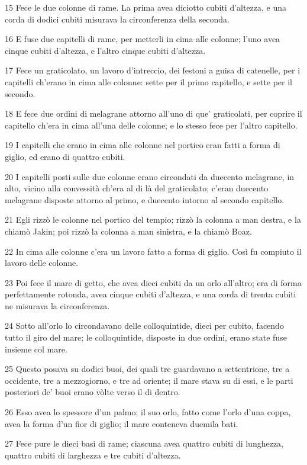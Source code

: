 \par 15 Fece le due colonne di rame. La prima avea diciotto cubiti d'altezza, e una corda di dodici cubiti misurava la circonferenza della seconda.
\par 16 E fuse due capitelli di rame, per metterli in cima alle colonne; l'uno avea cinque cubiti d'altezza, e l'altro cinque cubiti d'altezza.
\par 17 Fece un graticolato, un lavoro d'intreccio, dei festoni a guisa di catenelle, per i capitelli ch'erano in cima alle colonne: sette per il primo capitello, e sette per il secondo.
\par 18 E fece due ordini di melagrane attorno all'uno di que' graticolati, per coprire il capitello ch'era in cima all'una delle colonne; e lo stesso fece per l'altro capitello.
\par 19 I capitelli che erano in cima alle colonne nel portico eran fatti a forma di giglio, ed erano di quattro cubiti.
\par 20 I capitelli posti sulle due colonne erano circondati da duecento melagrane, in alto, vicino alla convessità ch'era al di là del graticolato; c'eran duecento melagrane disposte attorno al primo, e duecento intorno al secondo capitello.
\par 21 Egli rizzò le colonne nel portico del tempio; rizzò la colonna a man destra, e la chiamò Jakin; poi rizzò la colonna a man sinistra, e la chiamò Boaz.
\par 22 In cima alle colonne c'era un lavoro fatto a forma di giglio. Così fu compiuto il lavoro delle colonne.
\par 23 Poi fece il mare di getto, che avea dieci cubiti da un orlo all'altro; era di forma perfettamente rotonda, avea cinque cubiti d'altezza, e una corda di trenta cubiti ne misurava la circonferenza.
\par 24 Sotto all'orlo lo circondavano delle colloquintide, dieci per cubito, facendo tutto il giro del mare; le colloquintide, disposte in due ordini, erano state fuse insieme col mare.
\par 25 Questo posava su dodici buoi, dei quali tre guardavano a settentrione, tre a occidente, tre a mezzogiorno, e tre ad oriente; il mare stava su di essi, e le parti posteriori de' buoi erano vòlte verso il di dentro.
\par 26 Esso avea lo spessore d'un palmo; il suo orlo, fatto come l'orlo d'una coppa, avea la forma d'un fior di giglio; il mare conteneva duemila bati.
\par 27 Fece pure le dieci basi di rame; ciascuna avea quattro cubiti di lunghezza, quattro cubiti di larghezza e tre cubiti d'altezza.
